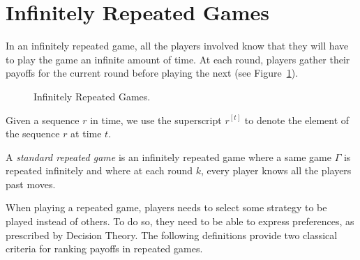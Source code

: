 \section{Infinitely Repeated Games}
\label{sec:InfRep}

In an infinitely repeated game, all the players involved know that they
will have to play the game an infinite amount of time.
At each round, players gather their payoffs for the current round before
playing the next (see Figure~\ref{fig:infiRepeated}).
\begin{figure}
    \centering
    \caption{Infinitely Repeated Games.}
    \label{fig:infiRepeated}
\end{figure}

\begin{notation}
Given a sequence $r$ in time, we use the superscript $r^{[t]}$ to denote
the element of the sequence $r$ at time $t$.
\end{notation}

\begin{definition}
A \emph{standard repeated game} is an infinitely repeated game where a
same game $\Gamma$ is repeated infinitely and where at each round $k$,
every player knows all the players past moves.
\end{definition}

When playing a repeated game, players needs to select some strategy to be
played instead of others. To do so, they need to be able to express
preferences, as prescribed by Decision Theory.
The following definitions provide two classical criteria for ranking
payoffs in repeated games.

